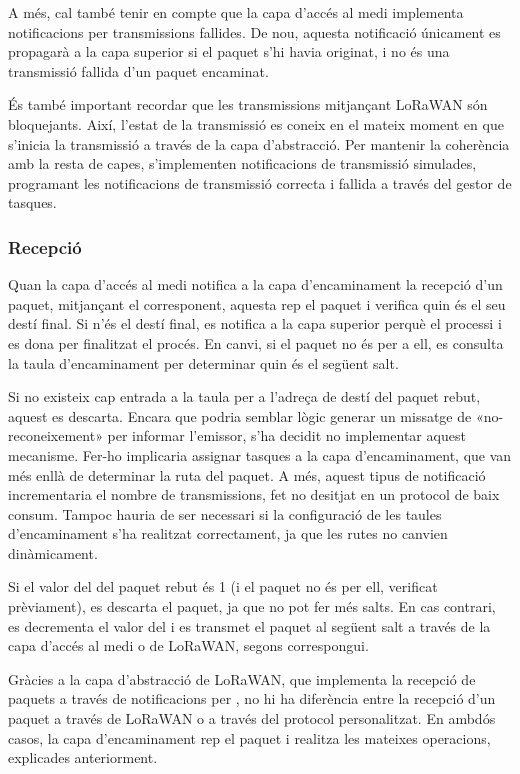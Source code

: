 \documentclass{tfgitic}[2024/07/01]
\begin{document}
{A més, cal també tenir en compte que la capa d'accés al medi implementa notificacions per transmissions fallides. De nou, aquesta notificació únicament es propagarà a la capa superior si el paquet s'hi havia originat, i no és una transmissió fallida d'un paquet encaminat. 

És també important recordar que les transmissions mitjançant LoRaWAN són bloquejants. Així, l'estat de la transmissió es coneix en el mateix moment en que s'inicia la transmissió a través de la capa d'abstracció. Per mantenir la coherència amb la resta de capes, s'implementen notificacions de transmissió simulades, programant les notificacions de transmissió correcta i fallida a través del gestor de tasques.
\subsubsection{Recepció}
\label{subsubsec:routing_rx}
Quan la capa d'accés al medi notifica a la capa d'encaminament la recepció d'un paquet, mitjançant el  corresponent, aquesta rep el paquet i verifica quin és el seu destí final. Si n'és el destí final, es notifica a la capa superior perquè el processi i es dona per finalitzat el procés. En canvi, si el paquet no és per a ell, es consulta la taula d'encaminament per determinar quin és el següent salt.

Si no existeix cap entrada a la taula per a l'adreça de destí del paquet rebut, aquest es descarta. Encara que podria semblar lògic generar un missatge de «no-reconeixement» per informar l'emissor, s'ha decidit no implementar aquest mecanisme. Fer-ho implicaria assignar tasques a la capa d'encaminament, que van més enllà de determinar la ruta del paquet. A més, aquest tipus de notificació incrementaria el nombre de transmissions, fet no desitjat en un protocol de baix consum. Tampoc hauria de ser necessari si la configuració de les taules d'encaminament s'ha realitzat correctament, ja que les rutes no canvien dinàmicament.

Si el valor del  del paquet rebut és 1 (i el paquet no és per ell, verificat prèviament), es descarta el paquet, ja que no pot fer més salts. En cas contrari, es decrementa el valor del  i es transmet el paquet al següent salt a través de la capa d'accés al medi o de LoRaWAN, segons correspongui.

Gràcies a la capa d'abstracció de LoRaWAN, que implementa la recepció de paquets a través de notificacions per , no hi ha diferència entre la recepció d'un paquet a través de LoRaWAN o a través del protocol personalitzat. En ambdós casos, la capa d'encaminament rep el paquet i realitza les mateixes operacions, explicades anteriorment.

}
\end{document}
